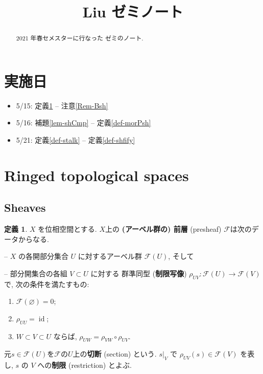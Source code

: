 \documentclass[12pt, a4paper, dvipdfmx]{jsarticle}
\title{Liu ゼミノート}
\author{}
\date{}
\theoremstyle{definition}
\newtheorem{Definition}[Axiom]{定義}
\newcommand{\F}{\mathcal{F}}
\newcommand{\id}{\mathop{\mathrm{id}}\nolimits} %
\numberwithin{equation}{section} %
\begin{document}
\maketitle

\begin{abstract}
    2021 年春セメスターに行なった \cite{Liu} ゼミのノート. 
\end{abstract}

\section*{実施日}
\begin{itemize}
    \item 5/15: 定義\ref{def-psh}   -- 注意\ref{Rem-Bsh}
    \item 5/16: 補題\ref{lem-shCmp} -- 定義\ref{def-morPsh}
    \item 5/21: 定義\ref{def-stalk} -- 定義\ref{def-shfify}
\end{itemize}

\setcounter{section}{1}

\section{Ringed topological spaces}

\subsection{Sheaves}

\begin{Definition}\label{def-psh}
    $X$ を位相空間とする. 
    $X$上の \textbf{(アーベル群の) 前層} (presheaf) 
    $\F$は次のデータからなる. 

    -- $X$ の各開部分集合 $U$ に対するアーベル群 $\F(U)$, そして

    -- 部分開集合の各組 $V \subset U$ に対する
    群準同型 (\textbf{制限写像}) $\rho_{UV} \colon \F(U)\to \F(V)$
    で, 次の条件を満たすもの: 
    \begin{enumerate}
        \renewcommand{\labelenumi}{({\arabic{enumi}})}
        \item $\F(\varnothing) = 0$; 
        \item $\rho_{UU} = \id$; 
        \item $W \subset V \subset U$ ならば, 
        $\rho_{UW} = \rho_{VW} \circ \rho_{UV}$.
    \end{enumerate}
    元$s\in \F(U)$を$\F$の$U$上の\textbf{切断} (section) という. 
    $s|_V$ で $\rho_{UV}(s)\in\F(V)$ を表し, 
    $s$ の $V$ への\textbf{制限} (restriction) とよぶ. 
\end{Definition}
\end{document}
